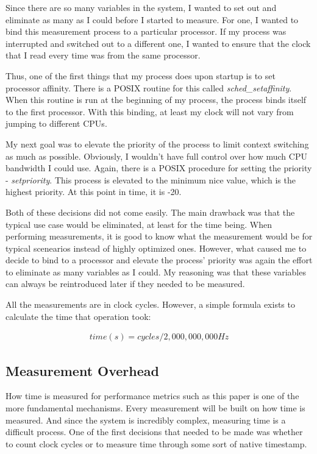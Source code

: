 \documentclass[paper=a4, fontsize=11pt]{scrartcl}
\numberwithin{equation}{section}        %
\numberwithin{figure}{section}          %
\numberwithin{table}{section}               %
\begin{document}
Since there are so many variables in the system, I wanted to set out and eliminate as many as I could before I started to measure.  For one, I wanted to bind this measurement process to a particular processor.  If my process was interrupted and switched out to a different one, I wanted to ensure that the clock that I read every time was from the same processor.

Thus, one of the first things that my process does upon startup is to set processor affinity.  There is a POSIX routine for this called \textit{sched\_setaffinity}.  When this routine is run at the beginning of my process, the process binds itself to the first processor.  With this binding, at least my clock will not vary from jumping to different CPUs.

My next goal was to elevate the priority of the process to limit context switching as much as possible.  Obviously, I wouldn't have full control over how much CPU bandwidth I could use.  Again, there is a POSIX procedure for setting the priority - \textit{setpriority}.  This process is elevated to the minimum nice value, which is the highest priority.  At this point in time, it is -20.

Both of these decisions did not come easily.  The main drawback was that the typical use case would be eliminated, at least for the time being.  When performing measurements, it is good to know what the measurement would be for typical scenearios instead of highly optimized ones.  However, what caused me to decide to bind to a processor and elevate the process' priority was again the effort to eliminate as many variables as I could.  My reasoning was that these variables can always be reintroduced later if they needed to be measured.

All the measurements are in clock cycles.  However, a simple formula exists to calculate the time that operation took:

\begin{gather}
time(s)=cycles/2,000,000,000 Hz
\end{gather}


\subsection{Measurement Overhead}

How time is measured for performance metrics such as this paper is one of the more fundamental mechanisms.  Every measurement will be built on how time is measured.  And since the system is incredibly complex, measuring time is a difficult process.  One of the first decisions that needed to be made was whether to count clock cycles or to measure time through some sort of native timestamp.
\end{document}
